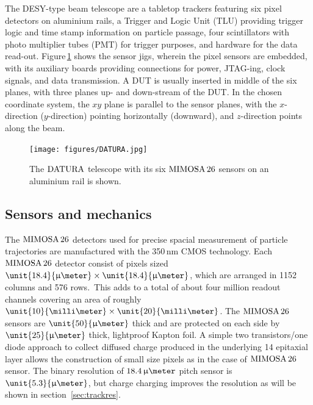 
The DESY-type beam telescope are a tabletop trackers featuring six pixel detectors on aluminium rails, a Trigger and Logic Unit (TLU) providing trigger logic and time stamp information on particle passage,
 four scintillators with photo multiplier tubes (PMT) for trigger purposes, and hardware for the data read-out. 
Figure\,\ref{fig:datura-tscope} shows the sensor jigs, wherein the pixel sensors are embedded, with its auxiliary boards providing connections for power, JTAG-ing, clock signals, and data transmission.
A DUT is usually inserted in middle of the six planes, with three planes up- and down-stream of the DUT. 
In the chosen coordinate system, the $xy$ plane is parallel to the sensor planes, with the $x$-direction ($y$-direction) pointing horizontally (downward), and $z$-direction points along the beam. 

\begin{figure}[tb]
	\center
	\texttt{[image: figures/DATURA.jpg]}
	\caption[The $\Datura$ telescope]{The $\Datura$ telescope with its six $\textrm{MIMOSA\,26}$ sensors on an aluminium rail is shown.}
	\label{fig:datura-tscope}
\end{figure}
 
\subsection{Sensors and mechanics}

The $\textrm{MIMOSA\,26}$ detectors used for precise spacial measurement of particle trajectories are manufactured with the 350\,nm CMOS technology. 
Each $\textrm{MIMOSA\,26}$ detector consist of pixels sized $\unit{18.4}{\upmu\meter} \times \unit{18.4}{\upmu\meter}$, which are arranged in 1152 columns and 576 rows.\,\cite{HuGuo2010480}
This adds to a total of about four million readout channels covering an area of roughly $\unit{10}{\milli\meter} \times \unit{20}{\milli\meter}$. 
The $\textrm{MIMOSA\,26}$ sensors are $\unit{50}{\upmu\meter}$ thick and are protected on each side by $\unit{25}{\upmu\meter}$ thick, lightproof Kapton foil. 
A simple two transistors/one diode approach to collect diffused charge produced in the underlying \unit{14}{\upmu\meter} epitaxial layer
 allows the construction of small size pixels as in the case of $\textrm{MIMOSA\,26}$ sensor.
The binary resolution of $18.4\,\upmu\meter$ pitch sensor is $\unit{5.3}{\upmu\meter}$, but charge charging improves the resolution as will be shown in section~\ref{sec:trackres}.

